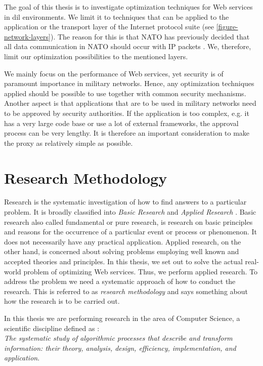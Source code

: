 The goal of this thesis is to investigate optimization techniques for Web
services in \gls{dil} environments. We limit it to techniques that can be
applied to the application or the transport layer of the Internet protocol suite
(see \cref{figure-network-layers}). The reason for this is that NATO has
previously decided that all data communication in NATO should occur with IP
packets \cite{nnec-study}. We, therefore, limit our optimization possibilities to
the mentioned layers.

We mainly focus on the performance of Web services, yet security is of paramount
importance in military networks. Hence, any optimization techniques applied
should be possible to use together with common security mechanisms. Another
aspect is that applications that are to be used in military networks need to be
approved by security authorities. If the application is too complex, e.g. it has
a very large code base or use a lot of external frameworks, the approval process
can be very lengthy. It is therefore an important consideration to make the
proxy as relatively simple as possible.


\section{Research Methodology}

Research is the systematic investigation of how to find answers to a particular
problem. It is broadly classified into \textit{Basic Research} and
\textit{Applied Research} \cite{rajasekar2006research}. Basic research also
called fundamental or pure research, is research on basic principles and reasons
for the occurrence of a particular event or process or phenomenon. It does not
necessarily have any practical application. Applied research, on the other hand,
is concerned about solving problems employing well known and accepted theories
and principles. In this thesis, we set out to solve the actual real-world
problem of optimizing Web services. Thus, we perform applied research. To
address the problem we need a systematic approach of how to conduct the
research. This is referred to as \textit{research methodology} and says
something about how the research is to be carried out.

In this thesis we are performing research in the area of Computer Science, a
scientific discipline defined as \cite{denning}: \\

\textit{The systematic study of algorithmic processes that
describe and transform information: their theory, analysis, design, efficiency,
implementation, and application}.

